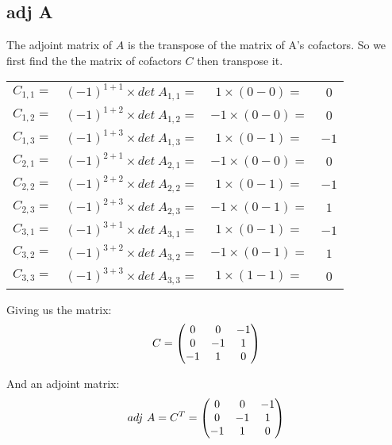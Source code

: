 \documentclass{article}
\numberwithin{equation}{subsection}
\begin{document}
	\subsection*{adj A}
	\begin{adjustwidth}{2em}{2em}
		The adjoint matrix of $A$ is the transpose of the matrix of A's cofactors. So we first
		find the the matrix of cofactors $C$ then transpose it.
		
		\begin{tabular}{c c c c}
			$C_{1,1} =$ & $(-1)^{1+1} \times det \ A_{1,1} =$ & $1\times (0-0) =$  & $0$\\	
			$C_{1,2} =$ & $(-1)^{1+2} \times det \ A_{1,2} =$ & $-1\times (0-0) =$  & $0$\\	
			$C_{1,3} =$ & $(-1)^{1+3} \times det \ A_{1,3} =$ & $1\times (0-1) =$  & $-1$\\	
			$C_{2,1} =$ & $(-1)^{2+1} \times det \ A_{2,1} =$ & $-1\times (0-0) =$  & $0$\\	
			$C_{2,2} =$ & $(-1)^{2+2} \times det \ A_{2,2} =$ & $1\times (0-1) =$  & $-1$\\	
			$C_{2,3} =$ & $(-1)^{2+3} \times det \ A_{2,3} =$ & $-1\times (0-1) =$  & $1$\\	
			$C_{3,1} =$ & $(-1)^{3+1} \times det \ A_{3,1} =$ & $1\times (0-1) =$  & $-1$\\	
			$C_{3,2} =$ & $(-1)^{3+2} \times det \ A_{3,2} =$ & $-1\times (0-1) =$  & $1$\\	
			$C_{3,3} =$ & $(-1)^{3+3} \times det \ A_{3,3} =$ & $1\times (1-1) =$  & $0$\\	
		\end{tabular}

		\vspace{10pt}
		\par{
			Giving us the matrix:
		}
		\begin{equation}\notag
			C = \begin{pmatrix}
						0  & 0  & -1 \\
						0  & -1 &	1	 \\
						-1 & 1	& 0
					\end{pmatrix}	
		\end{equation}

		\vspace{10pt}
		\par{
			And an adjoint matrix:
		}
		\begin{equation}\notag
			adj \ A = C^{T} = \begin{pmatrix}
														0 & 0 & -1 \\
														0 & -1 & 1 \\
														-1 & 1 & 0
												\end{pmatrix}
		\end{equation}
	\end{adjustwidth}
\end{document}
